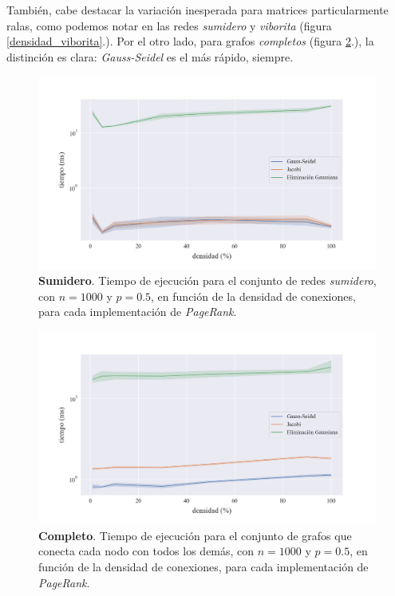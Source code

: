 También, cabe destacar la variación inesperada para matrices particularmente ralas, como podemos notar en las redes \textit{sumidero} y \textit{viborita} (figura \ref{densidad_viborita}.).
Por el otro lado, para grafos \textit{completos} (figura \ref{densidad_todo_con_todo}.), la distinción es clara: \textit{Gauss-Seidel} es el más rápido, siempre.

\begin{figure}[!htbp]
    \centering
    \includegraphics[width=.9\textwidth, trim=0 30 0 30]{files/src/.media/densidad_red_sumidero.png}
    \caption{\textbf{Sumidero}. Tiempo de ejecución para el conjunto de redes \textit{sumidero}, con $n = 1000$ y $p = 0.5$, en función de la densidad de conexiones, para cada implementación de \textit{PageRank}.}
    \label{densidad_red_sumidero}
\end{figure}

\begin{figure}[!htbp]
    \centering
    \includegraphics[width=.9\textwidth, trim=0 30 0 30]{files/src/.media/densidad_todo_con_todo.png}
    \caption{\textbf{Completo}. Tiempo de ejecución para el conjunto de grafos que conecta cada nodo con todos los demás, con $n = 1000$ y $p = 0.5$, en función de la densidad de conexiones, para cada implementación de \textit{PageRank}.}
    \label{densidad_todo_con_todo}
\end{figure}

